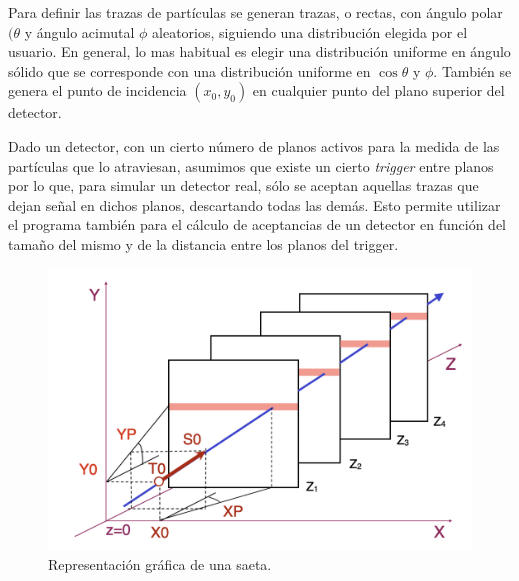 \documentclass[a4paper]{article}
\begin{document}
Para definir las trazas de partículas se generan trazas, o rectas, con ángulo polar $(\theta$ y ángulo acimutal $ \phi$ aleatorios, siguiendo una distribución elegida por el usuario. En general, lo mas habitual es elegir una distribución uniforme en ángulo sólido que se corresponde con una distribución uniforme en $\cos \theta$ y $\phi$.
También se genera el punto de incidencia $(x_0, y_0)$  en cualquier punto del plano superior del detector.

Dado un detector, con un cierto número de planos activos para la medida de las partículas que lo atraviesan, asumimos que  existe un cierto \textit{trigger} entre planos por lo que, para simular un detector real, sólo se aceptan aquellas trazas que dejan señal en dichos planos, descartando todas las demás. Esto permite utilizar el programa también para el cálculo de aceptancias de un detector en función del tamaño del mismo y de la distancia entre los planos del trigger.


\begin{figure}[h] 
  \centering
  \includegraphics[width=0.7\linewidth]{saeta_3d.png} 
  \caption{Representación gráfica de una saeta.}
  \label{fg:saeta} 
\end{figure}
\end{document}

